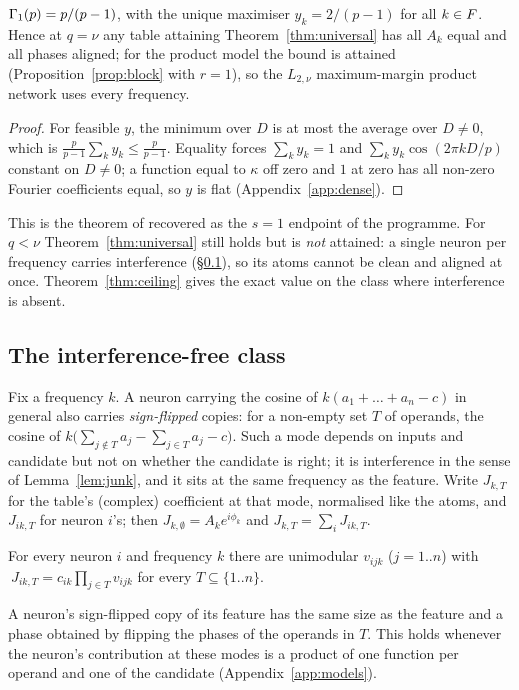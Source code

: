 \begin{corollary}
\label{cor:dense}
$\Gamma_1(p)=p/(p-1)$, with the unique maximiser $y_k=2/(p-1)$ for all $k\in F$. Hence at $q=\nu$ any table
attaining Theorem~\ref{thm:universal} has all $A_k$ equal and all phases aligned; for the product model
the bound is attained (Proposition~\ref{prop:block} with $r=1$), so the $L_{2,\nu}$ maximum-margin
product network uses every frequency.
\end{corollary}
\begin{proof}
For feasible $y$, the minimum over $D$ is at most the average over $D\neq 0$, which is
$\frac{p}{p-1}\sum_k y_k\le\frac{p}{p-1}$. Equality forces $\sum_k y_k=1$ and
$\sum_k y_k\cos(2\pi kD/p)$ constant on $D\neq 0$; a function equal to $\kappa$ off zero and $1$ at zero
has all non-zero Fourier coefficients equal, so $y$ is flat (Appendix~\ref{app:dense}).
\end{proof}
This is the theorem of \citet{morwani2024feature} recovered as the $s=1$ endpoint of the programme. For
$q<\nu$ Theorem~\ref{thm:universal} still holds but is \emph{not} attained: a single neuron per frequency
carries interference (\S\ref{sec:class}), so its atoms cannot be clean and aligned at once.
Theorem~\ref{thm:ceiling} gives the exact value on the class where interference is absent.

\subsection{The interference-free class}
\label{sec:class}

Fix a frequency $k$. A neuron carrying the cosine of $k(a_1+\dots+a_n-c)$ in general also carries
\emph{sign-flipped} copies: for a non-empty set $T$ of operands, the cosine of
$k\big(\sum_{j\notin T}a_j-\sum_{j\in T}a_j-c\big)$. Such a mode depends on inputs and candidate but not
on whether the candidate is right; it is interference in the sense of Lemma~\ref{lem:junk}, and it sits
at the same frequency as the feature. Write $J_{k,T}$ for the table's (complex) coefficient at that mode,
normalised like the atoms, and $J_{ik,T}$ for neuron $i$'s; then $J_{k,\emptyset}=A_ke^{i\phi_k}$ and
$J_{k,T}=\sum_iJ_{ik,T}$.

\begin{assumption}
\label{ass:sign}
For every neuron $i$ and frequency $k$ there are unimodular $v_{ijk}$ ($j=1..n$) with
$\ J_{ik,T}=c_{ik}\prod_{j\in T}v_{ijk}$ for every $T\subseteq\{1..n\}$.
\end{assumption}
A neuron's sign-flipped copy of its feature has the same size as the feature and a phase obtained by
flipping the phases of the operands in $T$. This holds whenever the neuron's contribution at these modes
is a product of one function per operand and one of the candidate (Appendix~\ref{app:models}).


